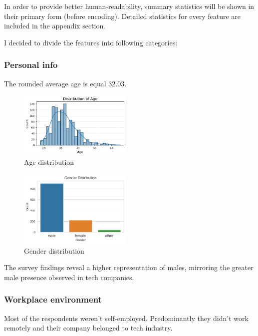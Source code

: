 \documentclass[conference]{IEEEtran}
\begin{document}
\twocolumn
In order to provide better human-readability, summary statistics will be shown in their primary form (before encoding). Detailed statistics for every feature are included in the appendix section.

I decided to divide the features into following categories:

\subsubsection{\textbf{Personal info}}
The rounded average age is equal 32.03.\\

\begin{figure}[H]
    \includegraphics[width=0.48\textwidth]{age-distribution}
    \caption{Age distribution}
\end{figure}

\begin{figure}[H]
    \includegraphics[width=0.48\textwidth]{gender-distribution}
    \caption{Gender distribution}
\end{figure}
The survey findings reveal a higher representation of males, mirroring the greater male presence observed in tech companies.\\ 

\subsubsection{\textbf{Workplace environment}}
Most of the respondents weren't self-employed. Predominantly they didn't work remotely and their company belonged to tech industry.\\
\end{document}

